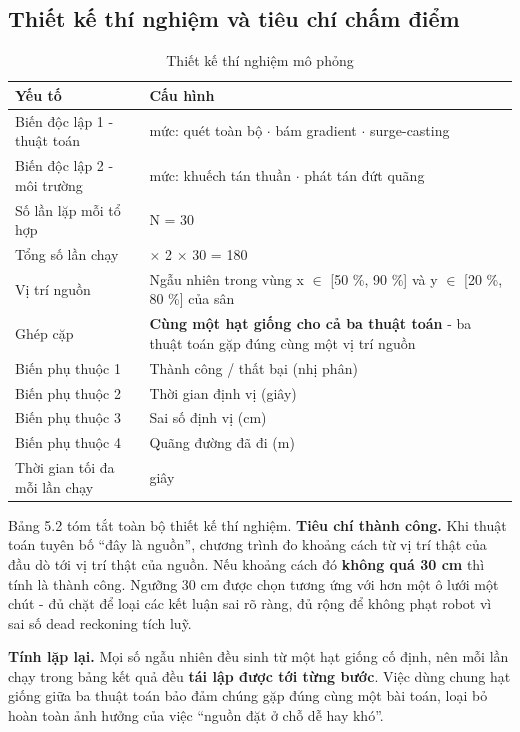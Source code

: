 \subsection{Thiết kế thí nghiệm và tiêu chí chấm điểm}
\begin{table}[!htbp]
  \centering
  \caption{Thiết kế thí nghiệm mô phỏng}
  \small
  \renewcommand{\arraystretch}{1.25}
  \begin{tabular}{>{\raggedright\arraybackslash}p{}>{\raggedright\arraybackslash}p{}}
    \toprule
    \textbf{Yếu tố} & \textbf{Cấu hình} \\
    \midrule
    Biến độc lập 1 - thuật toán & 3 mức: quét toàn bộ $\cdot$ bám gradient $\cdot$ surge-casting \\
    Biến độc lập 2 - môi trường & 2 mức: khuếch tán thuần $\cdot$ phát tán đứt quãng \\
    Số lần lặp mỗi tổ hợp & N = 30 \\
    Tổng số lần chạy & 3 $\times$ 2 $\times$ 30 = 180 \\
    Vị trí nguồn & Ngẫu nhiên trong vùng x $\in$ [50 \%, 90 \%] và y $\in$ [20 \%, 80 \%] của sân \\
    Ghép cặp & \textbf{Cùng một hạt giống cho cả ba thuật toán} - ba thuật toán gặp đúng cùng một vị trí nguồn \\
    Biến phụ thuộc 1 & Thành công / thất bại (nhị phân) \\
    Biến phụ thuộc 2 & Thời gian định vị (giây) \\
    Biến phụ thuộc 3 & Sai số định vị (cm) \\
    Biến phụ thuộc 4 & Quãng đường đã đi (m) \\
    Thời gian tối đa mỗi lần chạy & 480 giây \\
    \bottomrule
  \end{tabular}
\end{table}
Bảng 5.2 tóm tắt toàn bộ thiết kế thí nghiệm. \textbf{Tiêu chí thành công.} Khi thuật toán tuyên bố ``đây là nguồn'', chương trình đo khoảng cách từ vị trí thật của đầu dò tới vị trí thật của nguồn. Nếu khoảng cách đó \textbf{không quá 30 cm} thì tính là thành công. Ngưỡng 30 cm được chọn tương ứng với hơn một ô lưới một chút - đủ chặt để loại các kết luận sai rõ ràng, đủ rộng để không phạt robot vì sai số dead reckoning tích luỹ.

\textbf{Tính lặp lại.} Mọi số ngẫu nhiên đều sinh từ một hạt giống cố định, nên mỗi lần chạy trong bảng kết quả đều \textbf{tái lập được tới từng bước}. Việc dùng chung hạt giống giữa ba thuật toán bảo đảm chúng gặp đúng cùng một bài toán, loại bỏ hoàn toàn ảnh hưởng của việc ``nguồn đặt ở chỗ dễ hay khó''.


